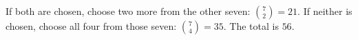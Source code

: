 If both are chosen, choose two more from the other seven: $\binom72=21$. If neither is chosen, choose all four from those seven: $\binom74=35$. The total is $\boxed{56}$.

